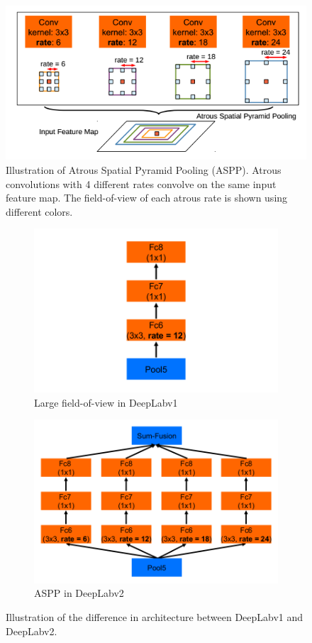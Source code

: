 	\begin{figure}[!htb]
		\centering
		\includegraphics[width=0.6\linewidth]{images/aspp}
		\caption{Illustration of Atrous Spatial Pyramid Pooling (ASPP). Atrous convolutions with 4 different rates convolve on the same input feature map. The field-of-view of each atrous rate is shown using different colors.}
		\label{Fig:aspp}
	\end{figure}
	
	\begin{figure}[!htb]
		\begin{subfigure}{.5\textwidth}
			\centering
			\includegraphics[width=1.03\linewidth]{images/v1_largeFOV}
			\caption{Large field-of-view in DeepLabv1}
		\end{subfigure}
		\begin{subfigure}{.5\textwidth}
			\centering
			\includegraphics[width=1\linewidth]{images/v2_aspp}
			\caption{ASPP in DeepLabv2}
		\end{subfigure}
		\caption{Illustration of the difference in architecture between DeepLabv1 and DeepLabv2.}
		\label{Fig:v1vsv2}
	\end{figure}
	
